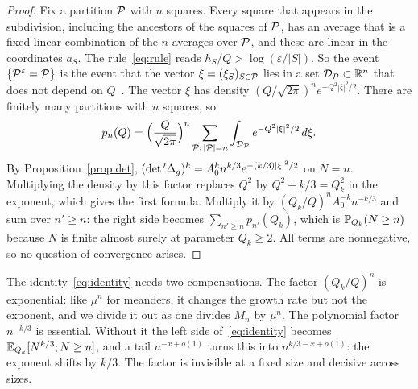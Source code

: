 \begin{proof}
Fix a partition $\mathcal{P}$ with $n$ squares. Every square that appears in the subdivision, including
the ancestors of the squares of $\mathcal{P}$, has an average that is a fixed linear combination of the
$n$ averages over $\mathcal{P}$, and these are linear in the coordinates $a_S$. The rule~\eqref{eq:rule}
reads $h_S/Q>\log(\varepsilon/|S|)$. So the event $\{\mathcal{P}^\varepsilon=\mathcal{P}\}$ is the event that the
vector $\xi=(\xi_S)_{S\in\mathcal{P}}$ lies in a set $\mathcal D_{\mathcal{P}}\subset\mathbb R^n$ that does not depend on
$Q$~\cite[Lemma~6.3]{APPS}. The vector $\xi$ has density $(Q/\sqrt{2\pi})^ne^{-Q^2|\xi|^2/2}$.
There are finitely many partitions with $n$ squares, so
\[
p_n(Q)=\Bigl(\frac Q{\sqrt{2\pi}}\Bigr)^n\sum_{\mathcal{P}:\,|\mathcal{P}|=n}\int_{\mathcal D_{\mathcal{P}}}e^{-Q^2|\xi|^2/2}\,d\xi .
\]
By Proposition~\ref{prop:det}, $(\det{}'\Delta_g)^k=A_0^kn^{k/3}e^{-(k/3)|\xi|^2/2}$ on $N=n$. Multiplying
the density by this factor replaces $Q^2$ by $Q^2+k/3=Q_k^2$ in the exponent, which gives the
first formula. Multiply it by $(Q_k/Q)^nA_0^{-k}n^{-k/3}$ and sum over $n'\ge n$: the right side
becomes $\sum_{n'\ge n}p_{n'}(Q_k)$, which is $\mathbb{P}_{Q_k}(N\ge n)$ because $N$ is finite almost
surely at parameter $Q_k\ge2$. All terms are nonnegative, so no question of convergence arises.
\end{proof}

The identity~\eqref{eq:identity} needs two compensations. The factor $(Q_k/Q)^{n}$ is exponential:
like $\mu^n$ for meanders, it changes the growth rate but not the exponent, and we divide it out as
one divides $M_n$ by $\mu^n$. The polynomial factor $n^{-k/3}$ is essential. Without it the left
side of~\eqref{eq:identity} becomes $\mathbb{E}_{Q_k}[N^{k/3};N\ge n]$, and a tail $n^{-x+o(1)}$ turns this
into $n^{k/3-x+o(1)}$: the exponent shifts by $k/3$. The factor is invisible at a fixed size and
decisive across sizes.
